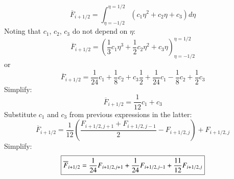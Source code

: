 \documentclass{warpdoc}
\newcommand\frameeqn[1]{\fbox{$\displaystyle #1$}}
\begin{document}
%
%
\begin{equation}
\overline{F}_{i+1/2}=\int_{\eta=-1/2}^{\eta=1/2} (c_1 \eta^2 + c_2 \eta + c_3 ) d\eta
\end{equation}
%
Noting that $c_1$, $c_2$, $c_3$ do not depend on $\eta$:
%
\begin{equation}
\overline{F}_{i+1/2}=\left(\frac{1}{3}c_1 \eta^3 + \frac{1}{2} c_2 \eta^2 + c_3 \eta\right)_{\eta=-1/2}^{\eta=1/2} 
\end{equation}
%
or
%
\begin{equation}
\overline{F}_{i+1/2}=\frac{1}{24}c_1  + \frac{1}{8} c_2  + c_3 \frac{1}{2}
+\frac{1}{24}c_1  - \frac{1}{8} c_2  + \frac{1}{2} c_3 
\end{equation}
%
Simplify:
%
\begin{equation}
\overline{F}_{i+1/2}=\frac{1}{12}c_1   + c_3 
\end{equation}
%
Substitute $c_1$ and $c_3$ from previous expressions in the latter:
%
\begin{equation}
\overline{F}_{i+1/2}=\frac{1}{12}\left(\frac{F_{i+1/2,j+1}+F_{i+1/2,j-1}}{2}- F_{i+1/2,j} \right)   + F_{i+1/2,j} 
\end{equation}
%
Simplify:
%
\begin{equation}
\frameeqn{
\overline{F}_{i+1/2}=\frac{1}{24} F_{i+1/2,j+1}+ \frac{1}{24}F_{i+1/2,j-1}   + \frac{11}{12}F_{i+1/2,j} 
}
\end{equation}
%








\appendix


  
  
\end{document}
